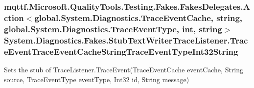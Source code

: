 \hypertarget{class_system_1_1_diagnostics_1_1_fakes_1_1_stub_text_writer_trace_listener_a6484297c7a49d8c8b1448f6873b3182a}{
\subsubsection[{Trace\-Event\-Trace\-Event\-Cache\-String\-Trace\-Event\-Type\-Int32\-String}]{\setlength{\rightskip}{0pt plus 5cm}mqttf.\-Microsoft.\-Quality\-Tools.\-Testing.\-Fakes.\-Fakes\-Delegates.\-Action$<$global.\-System.\-Diagnostics.\-Trace\-Event\-Cache, string, global.\-System.\-Diagnostics.\-Trace\-Event\-Type, int, string$>$ System.\-Diagnostics.\-Fakes.\-Stub\-Text\-Writer\-Trace\-Listener.\-Trace\-Event\-Trace\-Event\-Cache\-String\-Trace\-Event\-Type\-Int32\-String}}\label{class_system_1_1_diagnostics_1_1_fakes_1_1_stub_text_writer_trace_listener_a6484297c7a49d8c8b1448f6873b3182a}


Sets the stub of Trace\-Listener.\-Trace\-Event(\-Trace\-Event\-Cache event\-Cache, String source, Trace\-Event\-Type event\-Type, Int32 id, String message)

